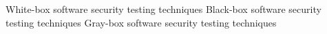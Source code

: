 \DefineEnglishString{\SoftwareSecurityWhiteBoxTestingTitle}
	{White-box software security testing techniques}
\DefineEnglishString{\SoftwareSecurityBlackBoxTestingTitle}
	{Black-box software security testing techniques}
\DefineEnglishString{\SoftwareSecurityGrayBoxTestingTitle}
	{Gray-box software security testing techniques}